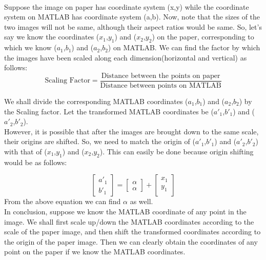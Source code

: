 \documentclass{article}
\begin{document}
\begin{enumerate}
\\ Suppose the image on paper has coordinate system (x,y) while the coordinate system on MATLAB has coordinate system (a,b). Now, note that the sizes of the two images will not be same, although their aspect ratios would be same. So, let's say we know the coordinates ($x_1$,$y_1$) and ($x_2$,$y_2$) on the paper, corresponding to which we know ($a_1$,$b_1$) and ($a_2$,$b_2$) on MATLAB.
We can find the factor by which the images have been scaled along each dimension(horizontal and vertical) as follows:
\begin{equation}
    \text{Scaling Factor} = \frac{\text{Distance between the points on paper}}{\text{Distance between points on MATLAB}}
\end{equation}

We shall divide the corresponding MATLAB coordinates ($a_1$,$b_1$) and ($a_2$,$b_2$) by the Scaling factor. Let the transformed MATLAB coordinates be ($a'_1$,$b'_1$) and ($a'_2$,$b'_2$).\\ However, it is possible that after the images are brought down to the same scale, their origins are shifted. So, we need to match the origin of ($a'_1$,$b'_1$) and ($a'_2$,$b'_2$) with that of ($x_1$,$y_1$) and ($x_2$,$y_2$). This can easily be done because origin shifting would be as follows:

\begin{equation}
    \begin{bmatrix}
        a'_1 \\
        b'_1
    \end{bmatrix}
          =
    \begin{bmatrix}
    \alpha \\
    \alpha
    \end{bmatrix}
       + 
    \begin{bmatrix}
        x_1 \\
        y_1 \\ 
    \end{bmatrix}
\end{equation}
From the above equation we can find $\alpha$ as well.\\
In conclusion, suppose we know the MATLAB coordinate of any point in the image. We shall first scale up/down the MATLAB coordinates according to the scale of the paper image, and then shift the transformed coordinates according to the origin of the paper image. Then we can clearly obtain the coordinates of any point on the paper if we know the MATLAB coordinates.


\end{enumerate}
\end{document}
